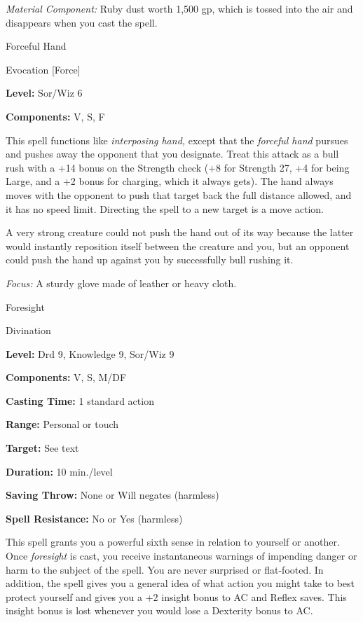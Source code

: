 \documentclass{article}
\begin{document}
\textit{Material Component: }Ruby dust worth 1,500 gp, which is tossed into the 
air and disappears when you cast the spell.

\vspace{12pt}
Forceful Hand

Evocation [Force]

\textbf{Level:} Sor/Wiz 6

\textbf{Components:} V, S, F

This spell functions like \textit{interposing hand, }except that the \textit{forceful 
hand }pursues and pushes away the opponent that you designate. Treat this attack 
as a bull rush with a +14 bonus on the Strength check (+8 for Strength 27, +4 for 
being Large, and a +2 bonus for charging, which it always gets). The hand always 
moves with the opponent to push that target back the full distance allowed, and 
it has no speed limit. Directing the spell to a new target is a move action.

A very strong creature could not push the hand out of its way because the latter 
would instantly reposition itself between the creature and you, but an opponent 
could push the hand up against you by successfully bull rushing it.

\textit{Focus: }A sturdy glove made of leather or heavy cloth.

\vspace{12pt}
Foresight

Divination

\textbf{Level:} Drd 9, Knowledge 9, Sor/Wiz 9

\textbf{Components:} V, S, M/DF

\textbf{Casting Time:} 1 standard action

\textbf{Range:} Personal or touch

\textbf{Target:} See text

\textbf{Duration:} 10 min./level

\textbf{Saving Throw:} None or Will negates (harmless)

\textbf{Spell Resistance:} No or Yes (harmless)

This spell grants you a powerful sixth sense in relation to yourself or another. 
Once \textit{foresight }is cast, you receive instantaneous warnings of impending 
danger or harm to the subject of the spell. You are never surprised or flat-footed. 
In addition, the spell gives you a general idea of what action you might take to 
best protect yourself and gives you a +2 insight bonus to AC and Reflex saves. 
This insight bonus is lost whenever you would lose a Dexterity bonus to AC.
\end{document}
